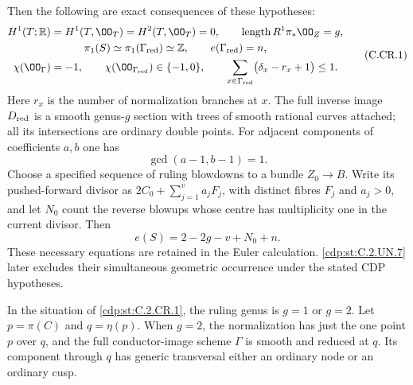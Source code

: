 \begin{proposition}
Then the following are exact consequences of these hypotheses:
\[
\begin{gathered}
 H^1(T;\mathbb R)=H^1(T,\OO_T)=H^2(T,\OO_T)=0,
 \qquad \operatorname{length}R^1\pi_*\OO_Z=g,\\
 \pi_1(S)\simeq\pi_1(\Gamma_{\rm red})\simeq\mathbb Z,
 \qquad e(\Gamma_{\rm red})=n,\\
 \chi(\OO_\Gamma)=-1,\qquad
 \chi(\OO_{\Gamma_{\rm red}})\in\{-1,0\},\qquad
 \sum_{x\in\Gamma_{\rm red}}\bigl(\delta_x-r_x+1\bigr)\le1.
\end{gathered}
\tag{C.CR.1}\label{cdp:eq:C.CR.1}
\]
Here $r_x$ is the number of normalization branches at $x$.
The full inverse image $D_{\rm red}$ is a smooth genus-$g$
section with trees of smooth rational curves attached; all
its intersections are ordinary double points. For adjacent
components of coefficients $a,b$ one has
\[
                         \gcd(a-1,b-1)=1.          \tag{C.CR.2}\label{cdp:eq:C.CR.2}
\]
Choose a specified sequence of ruling blowdowns to a bundle
$Z_0\to B$. Write its pushed-forward divisor as
$2C_0+\sum_{j=1}^{v}a_jF_j$, with distinct fibres $F_j$
and $a_j>0$, and let $N_0$ count the reverse blowups whose
centre has multiplicity one in the current divisor. Then
\[
                     e(S)=2-2g-v+N_0+n.           \tag{C.CR.3}\label{cdp:eq:C.CR.3}
\]
These necessary equations are retained in the Euler
calculation. \ref{cdp:st:C.2.UN.7} later excludes their simultaneous
geometric occurrence under the stated CDP hypotheses.
\end{proposition}

\begin{proposition}\label{cdp:st:C.2.CR.2}

In the situation of \ref{cdp:st:C.2.CR.1}, the ruling genus is $g=1$ or
$g=2$. Let $p=\pi(C)$ and $q=\eta(p)$. When $g=2$, the
normalization has just the one point $p$ over $q$, and the
full conductor-image scheme $\Gamma$ is smooth and reduced
at $q$. Its component through $q$ has generic transversal
either an ordinary node or an ordinary cusp.
\end{proposition}

